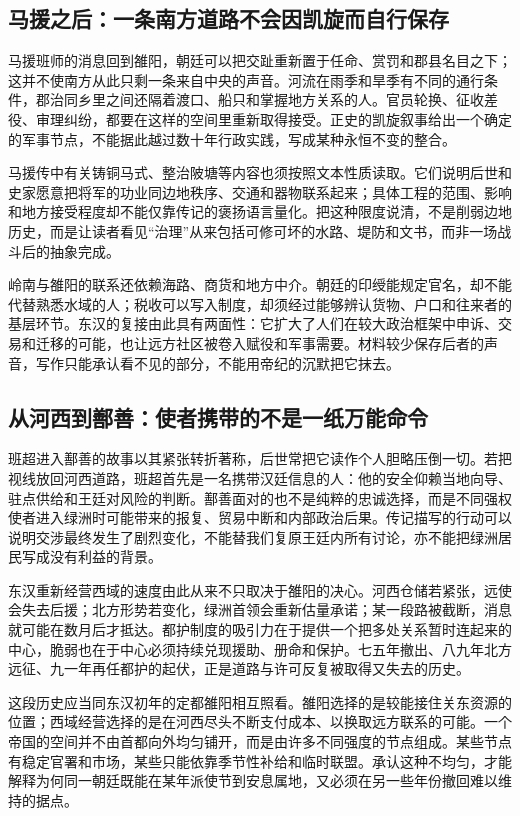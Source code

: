 \subsection{马援之后：一条南方道路不会因凯旋而自行保存}

马援班师的消息回到雒阳，朝廷可以把交趾重新置于任命、赏罚和郡县名目之下；这并不使南方从此只剩一条来自中央的声音。河流在雨季和旱季有不同的通行条件，郡治同乡里之间还隔着渡口、船只和掌握地方关系的人。官员轮换、征收差役、审理纠纷，都要在这样的空间里重新取得接受。正史的凯旋叙事给出一个确定的军事节点，不能据此越过数十年行政实践，写成某种永恒不变的整合。

马援传中有关铸铜马式、整治陂塘等内容也须按照文本性质读取。它们说明后世和史家愿意把将军的功业同边地秩序、交通和器物联系起来；具体工程的范围、影响和地方接受程度却不能仅靠传记的褒扬语言量化。把这种限度说清，不是削弱边地历史，而是让读者看见“治理”从来包括可修可坏的水路、堤防和文书，而非一场战斗后的抽象完成。

岭南与雒阳的联系还依赖海路、商货和地方中介。朝廷的印绶能规定官名，却不能代替熟悉水域的人；税收可以写入制度，却须经过能够辨认货物、户口和往来者的基层环节。东汉的复接由此具有两面性：它扩大了人们在较大政治框架中申诉、交易和迁移的可能，也让远方社区被卷入赋役和军事需要。材料较少保存后者的声音，写作只能承认看不见的部分，不能用帝纪的沉默把它抹去。

\subsection{从河西到鄯善：使者携带的不是一纸万能命令}

班超进入鄯善的故事以其紧张转折著称，后世常把它读作个人胆略压倒一切。若把视线放回河西道路，班超首先是一名携带汉廷信息的人：他的安全仰赖当地向导、驻点供给和王廷对风险的判断。鄯善面对的也不是纯粹的忠诚选择，而是不同强权使者进入绿洲时可能带来的报复、贸易中断和内部政治后果。传记描写的行动可以说明交涉最终发生了剧烈变化，不能替我们复原王廷内所有讨论，亦不能把绿洲居民写成没有利益的背景。

东汉重新经营西域的速度由此从来不只取决于雒阳的决心。河西仓储若紧张，远使会失去后援；北方形势若变化，绿洲首领会重新估量承诺；某一段路被截断，消息就可能在数月后才抵达。都护制度的吸引力在于提供一个把多处关系暂时连起来的中心，脆弱也在于中心必须持续兑现援助、册命和保护。七五年撤出、八九年北方远征、九一年再任都护的起伏，正是道路与许可反复被取得又失去的历史。

这段历史应当同东汉初年的定都雒阳相互照看。雒阳选择的是较能接住关东资源的位置；西域经营选择的是在河西尽头不断支付成本、以换取远方联系的可能。一个帝国的空间并不由首都向外均匀铺开，而是由许多不同强度的节点组成。某些节点有稳定官署和市场，某些只能依靠季节性补给和临时联盟。承认这种不均匀，才能解释为何同一朝廷既能在某年派使节到安息属地，又必须在另一些年份撤回难以维持的据点。

